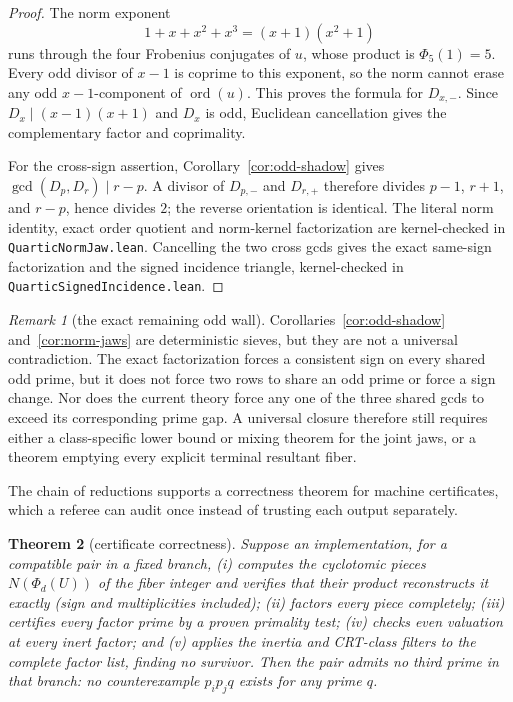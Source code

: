 \documentclass[11pt]{amsart}
\newtheorem{theorem}{Theorem}[section]
\theoremstyle{definition}
\theoremstyle{remark}
\newtheorem{remark}[theorem]{Remark}
\begin{document}
\begin{proof}
The norm exponent
\[
1+x+x^2+x^3=(x+1)(x^2+1)
\]
runs through the four Frobenius conjugates of \(u\), whose product is
\(\Phi_5(1)=5\).  Every odd divisor of \(x-1\) is coprime to this exponent,
so the norm cannot erase any odd \(x-1\)-component of
\(\operatorname{ord}(u)\).  This proves the formula for \(D_{x,-}\).
Since \(D_x\mid(x-1)(x+1)\) and \(D_x\) is odd, Euclidean cancellation
gives the complementary factor and coprimality.

For the cross-sign assertion, Corollary~\ref{cor:odd-shadow} gives
\(\gcd(D_p,D_r)\mid r-p\).  A divisor of \(D_{p,-}\) and \(D_{r,+}\)
therefore divides \(p-1\), \(r+1\), and \(r-p\), hence divides \(2\);
the reverse orientation is identical.  The literal norm identity, exact
order quotient and norm-kernel factorization are kernel-checked in
\texttt{QuarticNormJaw.lean}.  Cancelling the two cross gcds gives the
exact same-sign factorization and the signed incidence triangle,
kernel-checked in \texttt{QuarticSignedIncidence.lean}.
\end{proof}

\begin{remark}[the exact remaining odd wall]
Corollaries~\ref{cor:odd-shadow} and~\ref{cor:norm-jaws} are deterministic
sieves, but they are not a universal contradiction.  The exact
factorization forces a consistent sign on every shared odd prime, but it
does not force two rows to share an odd prime or force a sign change.  Nor
does the current theory force any one of the three shared gcds to exceed its
corresponding prime gap.  A universal closure therefore still requires
either a class-specific lower bound or mixing theorem for the joint jaws, or
a theorem emptying every explicit terminal resultant fiber.
\end{remark}

The chain of reductions supports a correctness theorem for machine
certificates, which a referee can audit once instead of trusting each
output separately.

\begin{theorem}[certificate correctness]\label{thm:certificate}
Suppose an implementation, for a compatible pair in a fixed branch,
(i) computes the cyclotomic pieces $N(\Phi_d(U))$ of the fiber integer
and verifies that their product reconstructs it exactly (sign and
multiplicities included); (ii) factors every piece completely;
(iii) certifies every factor prime by a proven primality test;
(iv) checks even valuation at every inert factor; and (v) applies the
inertia and CRT-class filters to the complete factor list, finding no
survivor. Then the pair admits no third prime in that branch: no
counterexample $p_i p_j q$ exists for any prime $q$.
\end{theorem}
\end{document}
